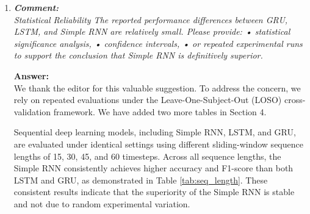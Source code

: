\documentclass[12pt]{article}
\begin{document}
\begin{enumerate}
  
\item \textit{	\textbf{Comment:\\}	Statistical Reliability The reported performance differences between GRU, LSTM, and Simple RNN are relatively small. Please provide: • statistical significance analysis, • confidence intervals, • or repeated experimental runs to support the conclusion that Simple RNN is definitively superior. 	}

\textbf{Answer:\\} We thank the editor for this valuable suggestion. To address the concern, we rely on repeated evaluations under the Leave-One-Subject-Out (LOSO) cross-validation framework. We have added two more tables in Section 4.

Sequential deep learning models, including Simple RNN, LSTM, and GRU, are evaluated under identical settings using different sliding-window sequence lengths of 15, 30, 45, and 60 timesteps. Across all sequence lengths, the Simple RNN consistently achieves higher accuracy and F1-score than both LSTM and GRU, as demonstrated in Table \ref{tab:seq_length}. These consistent results indicate that the superiority of the Simple RNN is stable and not due to random experimental variation.


\end{enumerate}
\end{document}
